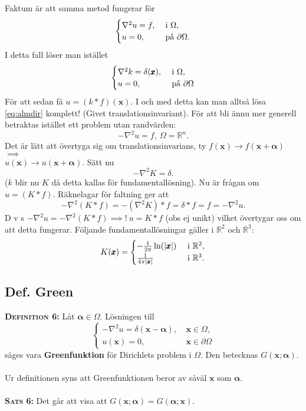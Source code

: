 \documentclass{article}
\begin{document}
Faktum är att samma metod fungerar för 
\begin{equation}
    \begin{cases}
        \nabla^2u=f, \ &$i$ \ \Omega,\\ u=0, \ &$på$ \ \partial\Omega.
    \end{cases}
\end{equation}
I detta fall löser man istället 
\begin{equation}
    \begin{cases}
       \nabla^2k=\delta(\pmb{x}), \ &$i$ \ \Omega,\\ u=0, \ &$på$ \ \partial\Omega
    \end{cases}
\end{equation}
För att sedan få $u=(k*f)(\pmb{x})$.
I och med detta kan man alltså lösa \eqref{eq:almdir} komplett! (Givet translationsinvariant).
\newpage
\noindent
För att bli ännu mer generell betraktas istället ett problem utan randvärden:
\begin{equation}\label{eq:helaR}
    -\nabla^2u=f, \ \Omega=\mathbb{R}^n.
\end{equation}
Det är lätt att övertyga sig om translationsinvarians, ty $f(\pmb{x})\longrightarrow f(\pmb{x}+\pmb{\alpha})$ $\implies$\\ $u(\pmb{x})\longrightarrow u(\pmb{x}+\pmb{\alpha})$. Sätt nu
$$
-\nabla^2K=\delta.
$$
($k$ blir nu $K$ då detta kallas för fundamentallösning). Nu är frågan om $u=(K*f)$. Räknelagar för faltning ger att
$$
-\nabla^2(K*f)=-(\nabla^2K)*f=\delta*f=f=-\nabla^2u.
$$
D v s $-\nabla^2u=-\nabla^2(K*f) \implies ! \ u=K*f$ (obs ej unikt) vilket övertygar oss om att detta fungerar. Följande fundamentallösningar gäller i $\mathbb{R}^2$ och $\mathbb{R}^3$:
\begin{equation}
    K(\pmb{x})=
    \begin{cases}
       -\frac{1}{2\pi}\ln(|\pmb{x}|) \ &$i$ \ \mathbb{R}^2,\\
       \frac{1}{4\pi|\pmb{x}|} \ &$i$ \ \mathbb{R}^3.
    \end{cases}
\end{equation}
\subsection{Def. Green}
\textbf{\textsc{Definition 6:}} Låt $\pmb{\alpha}\in\Omega$. Lösningen till
\begin{equation}
    \begin{cases}
    -\nabla^2u=\delta(\pmb{x}-\pmb{\alpha}), \ &\pmb{x}\in\Omega,\\
    u(\pmb{x})=0, \ &\pmb{x}\in\partial\Omega
    \end{cases}
\end{equation}
säges vara \textbf{Greenfunktion} för Dirichlets problem i $\Omega$. Den betecknas $G(\pmb{x};\pmb{\alpha})$.\\ \\
Ur definitionen syns att Greenfunktionen beror av såväl $\pmb{x}$ som $\pmb{\alpha}$. \\ \\
\textbf{\textsc{Sats 6:}} Det går att visa att $G(\pmb{x};\pmb{\alpha})=G(\pmb{\alpha};\pmb{x}).$\\ \\
\end{document}
